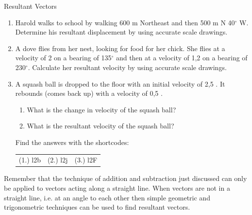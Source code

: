 \begin{exercises}{Resultant Vectors}{ \noindent
\begin{enumerate}[noitemsep, label=\textbf{\arabic*}.]
\item Harold walks to school by walking 600 m Northeast and then 500 m N 40$^\circ$ W. Determine his resultant displacement by using accurate scale drawings.
\item A dove flies from her nest, looking for food for her chick. She flies at a velocity of 2 \ms on a bearing of 135$^\circ$ and then at a velocity of 1,2 \ms on a bearing of 230$^\circ$. Calculate her resultant velocity by using accurate scale drawings.
\item A squash ball is dropped to the floor with an initial velocity of 2,5 \ms. It rebounds (comes back up) with a velocity of 0,5 \ms. \begin{enumerate}
	\item What is the change in velocity of the squash ball?
	\item What is the resultant velocity of the squash ball?
	\end{enumerate}
  \label{59e414b70efc194a27a122db47d06ce6**end}
\par {} Find the answers with the shortcodes:
 \par \begin{tabular}[h]{ccc}
 (1.) l2b  &  (2.) l2j  &  (3.) l2F  \end{tabular}
\end{enumerate}
}
\end{exercises}

Remember that the technique of addition and subtraction just discussed can only be applied to vectors acting along a straight line. When vectors are not in a straight line, i.e. at an angle to each other then simple geometric and trigonometric techniques can be used to find resultant vectors.

